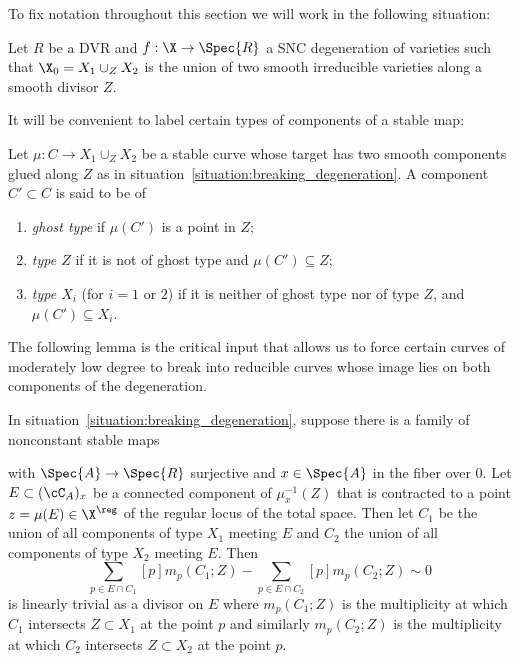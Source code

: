 \documentclass[12pt]{article}
\begin{document}
To fix notation throughout this section we will work in the following situation:

\begin{situation} \label{situation:breaking_degeneration}
Let $R$ be a DVR and $f : \X \to \Spec{R}$ a SNC degeneration of varieties such that $\X_0 = X_1 \cup_Z X_2$ is the union of two smooth irreducible varieties along a smooth divisor $Z$. 
\end{situation}


It will be convenient to label certain types of components of a stable map:

\begin{defn}
Let $\mu : C \to X_1 \cup_Z X_2$ be a stable curve whose target has two smooth components glued along $Z$ as in situation~\ref{situation:breaking_degeneration}. A component $C' \subset C$ is said to be of
\begin{enumerate}
    \item \emph{ghost type} if $\mu(C')$ is a point in $Z$;
    \item \emph{type $Z$} if it is not of ghost type and $\mu(C')\subseteq Z$; 
    \item \emph{type $X_i$} (for $i=1$ or $2$) if it is neither of ghost type nor of type $Z$, and $\mu(C')\subseteq X_i$.
\end{enumerate}
\end{defn}

The following lemma is the critical input that allows us to force certain curves of moderately low degree to break into reducible curves whose image lies on both components of the degeneration. 

\begin{lemma} \label{lemma:divisorial_multiplicity_matching}
In situation~\ref{situation:breaking_degeneration}, suppose there is a family of nonconstant stable maps
\begin{center}
\end{center}
with $\Spec{A} \to \Spec{R}$ surjective and $x \in \Spec{A}$ in the fiber over $0$. Let $E \subset (\cC_A)_x$ be a connected component of $\mu_x^{-1}(Z)$ that is contracted to a point $z = \mu(E) \in \X^{\reg}$ of the regular locus of the total space. Then let $C_1$ be the union of all components of type $X_1$ meeting $E$ and $C_2$ the union of all components of type $X_2$ meeting $E$. Then
\[ \sum_{p \in E \cap C_1} [p] m_p(C_1; Z) - \sum_{p \in E \cap C_2} [p] m_p(C_2 ; Z) \sim 0 \]
is linearly trivial as a divisor on $E$ where $m_p(C_1 ; Z)$ is the multiplicity at which $C_1$ intersects $Z \subset X_1$ at the point $p$ and similarly $m_p(C_2 ; Z)$ is the multiplicity at which $C_2$ intersects $Z \subset X_2$ at the point $p$.  
\end{lemma}
\end{document}
